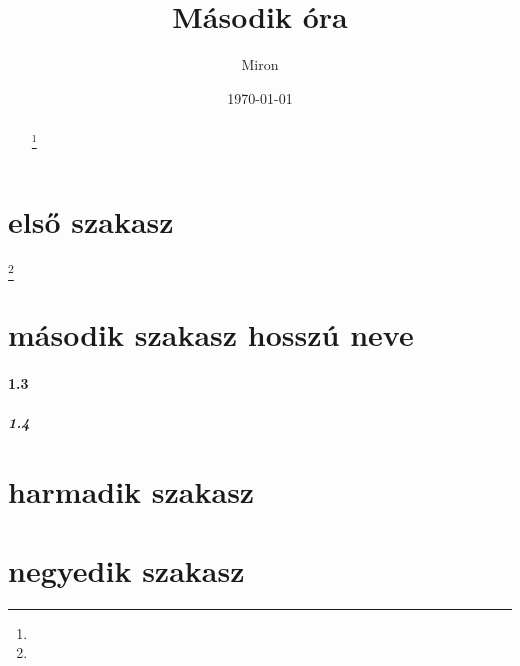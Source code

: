 \documentclass[twocolumn,twoside]{article}
\title{Második óra}
\author{Miron}
\date{\today}
\begin{document}
\maketitle

\begin{abstract}
\hulipsum[1]

\hulipsum[2]
\footnote{}
\end{abstract}

\tableofcontents
{}
\pagebreak




\section{első szakasz}
\footnote{}
\subsection{}
\hulipsum[1]



\subsection{}
\hulipsum[1]

\vspace{8cm}
\section[masodik szakasz]{második szakasz hosszú neve}

\paragraph{1.3}
\hulipsum[1]
\subparagraph{1.4}
\hulipsum[1]


\appendix
\section{harmadik szakasz}
\subsection{}
\subsection{}

\section{negyedik szakasz}
\end{document}
